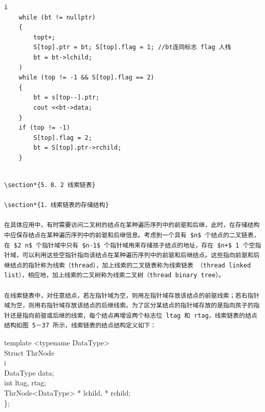 \documentclass[10pt]{article}
\begin{document}
\begin{verbatim}
i
    while (bt != nullptr)
    {
        topt+;
        S[top].ptr = bt; S[top].flag = 1; //bt连同标志 flag 人栈
        bt = bt->lchild;
    )
    while (top != -1 && S[top].flag == 2)
    {
        bt = s[top--].ptr;
        cout <<bt->data;
    }
    if (top != -1)
        S[top].flag = 2;
        bt = S[top].ptr->rchild;
    }
\end{verbatim}

\begin{verbatim}

\section*{5．8．2 线索链表}

\section*{1．线索链表的存储结构}

在具体应用中，有时需要访问二叉树的结点在某种遍历序列中的前驱和后继，此时，在存储结构中应保存结点在某种遍历序列中的前驱和后继信息。考虑到一个具有 $n$ 个结点的二叉链表，在 $2 n$ 个指针域中只有 $n-1$ 个指针域用来存储孩子结点的地址，存在 $n+$ 1 个空指针域，可以利用这些空指针指向该结点在某种遍历序列中的前驱和后继结点。这些指向前驱和后继结点的指针称为线索（thread），加上线索的二叉链表称为线索链表 （thread linked list），相应地，加上线索的二叉树称为线索二叉树（thread binary tree）。

在线索链表中，对任意结点，若左指针域为空，则用左指针域存放该结点的前驱线索；若右指针域为空，则用右指针域存放该结点的后继线索。为了区分某结点的指针域存放的是指向孩子的指针还是指向前驱或后继的线索，每个结点再增设两个标志位 ltag 和 rtag，线索链表的结点结构如图 5－37 所示，线索链表的结点结构定义如下：
\end{verbatim}

template <typename DataType>\\
Struct ThrNode\\
i\\
DataType data;\\
int ltag, rtag;\\
ThrNode<DataType> * lchild, * rchild;\\
\};
\end{document}
